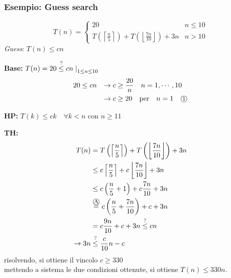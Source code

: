 \subsubsection{Esempio: Guess search}
\[
    T(n) = 
    \begin{cases} 
        20      &  n \leq 10 \\
        T \left( \left\lceil \frac{n}{5} \right\rceil \right) + 
        T \left( \left\lfloor \frac{7n}{10} \right\rfloor \right) + 3n & n > 10
    \end{cases}
\]
\textit{Guess}: $T(n) \leq cn$
\begin{description}
    \item{\textbf{Base:}}
        $ T(n) = 20 \overset{?}{\leq} cn \left. \right|_{1 \leq n \leq 10} $
        \begin{align*}
            20& \leq cn& \rightarrow c& \geq \frac{20}{n} \quad n=1,\cdots,10 \\
              &        & \rightarrow c& \geq 20 \quad \text{per} \quad n=1 \quad \mbox{\textcircled{\footnotesize 1}} 
        \end{align*}
    \item{\textbf{HP:}} $T(k) \leq ck \quad \forall k<n $ con $ n \geq 11 $
    \item{\textbf{TH:}} 
        \begin{equation*}
            \begin{split}
                T(n) &=
                T \left( \left\lceil \frac{n}{5} \right\rceil \right) + 
                T \left( \left\lfloor \frac{7n}{10} \right\rfloor \right) + 3n \\
                &\leq c \left\lceil \frac{n}{5} \right\rceil  + 
                c \left\lfloor \frac{7n}{10} \right\rfloor  + 3n \\
                & \leq c \left( \frac{n}{5}+1 \right) + c \frac{7n}{10} + 3n \\
                & \overset{\mbox{\textcircled{\footnotesize A}}}{=} c \left( \frac{n}{5} + \frac{7n}{10} \right) + c + 3n \\
                &= c \frac{9n}{10} + c + 3n \overset{?}{\leq} cn\\
                \rightarrow 3n & \overset{?}{\leq} \frac{c}{10}n -c \\
            \end{split}
        \end{equation*}
        risolvendo, si ottiene il vincolo $c \geq 330$ \\
        mettendo a sistema le due condizioni ottenute, si ottiene $T(n) \leq 330n$.\\

\end{description}
